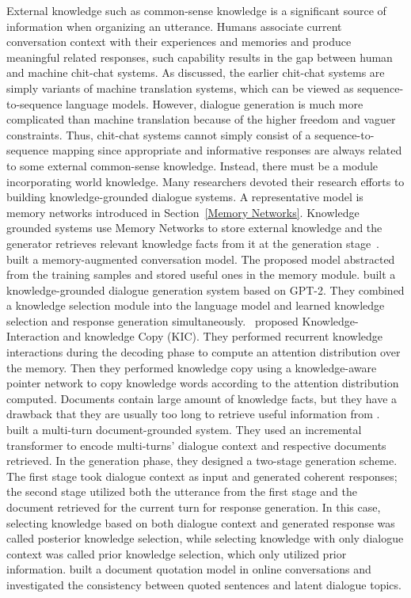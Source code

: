 \label{Knowledge-Grounded System}
External knowledge such as common-sense knowledge is a significant source of information when organizing an utterance. Humans associate current conversation context with their experiences and memories and produce meaningful related responses, such capability results in the gap between human and machine chit-chat systems. As discussed, the earlier chit-chat systems are simply variants of machine translation systems, which can be viewed as sequence-to-sequence language models. However, dialogue generation is much more complicated than machine translation because of the higher freedom and vaguer constraints. Thus, chit-chat systems cannot simply consist of a sequence-to-sequence mapping since appropriate and informative responses are always related to some external common-sense knowledge. Instead, there must be a module incorporating world knowledge. 
Many researchers devoted their research efforts to building knowledge-grounded dialogue systems. A representative model is memory networks introduced in Section~\ref{Memory Networks}. Knowledge grounded systems use Memory Networks to store external knowledge and the generator retrieves relevant knowledge facts from it at the generation stage~.~ built a memory-augmented conversation model. The proposed model abstracted from the training samples and stored useful ones in the memory module.  built a knowledge-grounded dialogue generation system based on GPT-2. They combined a knowledge selection module into the language model and learned knowledge selection and response generation simultaneously.~ proposed Knowledge-Interaction and knowledge Copy (KIC). They performed recurrent knowledge interactions during the decoding phase to compute an attention distribution over the memory. Then they performed knowledge copy using a knowledge-aware pointer network to copy knowledge words according to the attention distribution computed. 
Documents contain large amount of knowledge facts, but they have a drawback that they are usually too long to retrieve useful information from .~ built a multi-turn document-grounded system. They used an incremental transformer to encode multi-turns' dialogue context and respective documents retrieved. In the generation phase, they designed a two-stage generation scheme. The first stage took dialogue context as input and generated coherent responses; the second stage utilized both the utterance from the first stage and the document retrieved for the current turn for response generation. In this case, selecting knowledge based on both dialogue context and generated response was called posterior knowledge selection, while selecting knowledge with only dialogue context was called prior knowledge selection, which only utilized prior information.  built a document quotation model in online conversations and investigated the consistency between quoted sentences and latent dialogue topics. 
